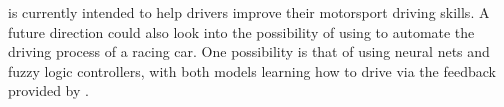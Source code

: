 \methodname is currently intended to help drivers improve their motorsport driving skills. A future direction could also look into the possibility of using \methodname to automate the driving process of a racing car. One possibility is that of using neural nets and fuzzy logic controllers, with both models learning how to drive via the feedback provided by \methodname. 

%
%
%
%
%
